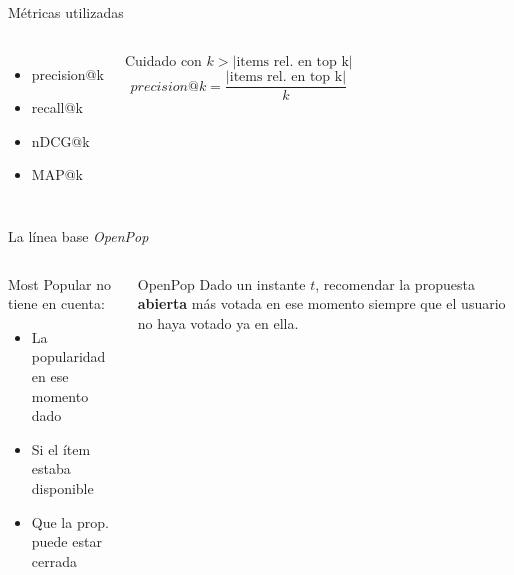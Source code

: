\begin{frame}{Métricas utilizadas}   
\begin{columns}
    \begin{itemize}
        \item precision@k
        \item recall@k
        \item nDCG@k
        \item MAP@k
    \end{itemize}
    \pause
    \centering
    \begin{alertblock}{Cuidado con $k>\left|\text{items rel. en top k}\right|$}
    \begin{equation}
        precision@k=\frac{\left|\text{items rel. en top k}\right|}{k}
    \end{equation}
    \end{alertblock}
\end{columns}
\end{frame}

\begin{frame}{La línea base \textit{OpenPop}}
\begin{columns}
    \begin{alertblock}{Most Popular no tiene en cuenta:}
    \begin{itemize}
        \item La popularidad en ese momento dado
        \item Si el ítem estaba disponible
        \item Que la prop. puede estar cerrada
    \end{itemize}
    \end{alertblock}
    \pause
    \begin{exampleblock}{OpenPop}
        Dado un instante $t$, recomendar la propuesta \textbf{abierta} más votada en ese momento siempre que el usuario no haya votado ya en ella.
    \end{exampleblock}
\end{columns}

\end{frame}
